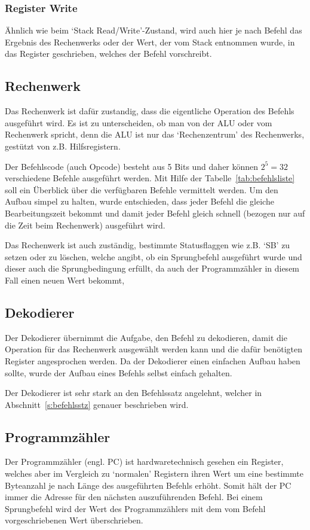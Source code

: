 \subsubsection{Register Write}
Ähnlich wie beim `Stack Read/Write'-Zustand, wird auch hier je nach Befehl das
Ergebnis des Rechenwerks oder der Wert, der vom Stack entnommen wurde, in das
Register geschrieben, welches der Befehl vorschreibt.
\subsection{Rechenwerk}
\label{s:alu}
Das Rechenwerk ist dafür zustandig, dass die eigentliche Operation des Befehls
ausgeführt wird. Es ist zu unterscheiden, ob man von der \ac{ALU} oder vom
Rechenwerk spricht, denn die \ac{ALU} ist nur das `Rechenzentrum' des
Rechenwerks, gestützt von z.B. Hilfsregistern.

Der Befehlscode (auch Opcode) besteht aus 5 Bits und daher können $2^{5} = 32$
verschiedene Befehle ausgeführt werden. Mit Hilfe der
Tabelle~\ref{tab:befehlsliste} soll ein Überblick über die verfügbaren Befehle
vermittelt werden. Um den Aufbau simpel zu halten, wurde entschieden, dass jeder
Befehl die gleiche Bearbeitungszeit bekommt und damit jeder Befehl gleich
schnell (bezogen nur auf die Zeit beim Rechenwerk) ausgeführt wird.

Das Rechenwerk ist auch zuständig, bestimmte Statusflaggen wie z.B. `SB' zu
setzen oder zu löschen, welche angibt, ob ein Sprungbefehl ausgeführt wurde und
dieser auch die Sprungbedingung erfüllt, da auch der Programmzähler in diesem
Fall einen neuen Wert bekommt,
\clearpage
\pagebreak
\subsection{Dekodierer}
\label{s:decode}
Der Dekodierer übernimmt die Aufgabe, den Befehl zu dekodieren, damit die
Operation für das Rechenwerk ausgewählt werden kann und die dafür benötigten
Register angesprochen werden. Da der Dekodierer einen einfachen Aufbau haben
sollte, wurde der Aufbau eines Befehls selbst einfach gehalten.

Der Dekodierer ist sehr stark an den Befehlssatz angelehnt, welcher in
Abschnitt~\ref{s:befehlsstz} genauer beschrieben wird.
\subsection{Programmzähler}
\label{s:pc}
Der Programmzähler (engl. \ac{PC}) ist hardwaretechnisch gesehen ein Register,
welches aber im Vergleich zu `normalen' Registern ihren Wert um eine bestimmte
Byteanzahl je nach Länge des ausgeführten Befehls erhöht. Somit hält der \ac{PC}
immer die Adresse für den nächsten auszuführenden Befehl. Bei einem Sprungbefehl
wird der Wert des Programmzählers mit dem vom Befehl vorgeschriebenen Wert
überschrieben.

